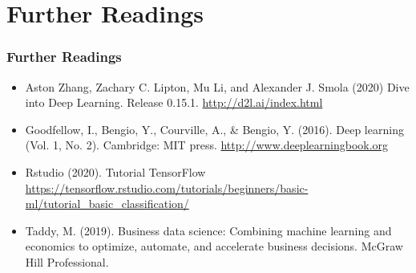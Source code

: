 \documentclass[
  shownotes,
  xcolor={svgnames},
  hyperref={colorlinks,citecolor=DarkBlue,linkcolor=DarkRed,urlcolor=DarkBlue}
  , aspectratio=169]{beamer}
\begin{document}
\section{Further Readings}
\begin{frame}
\frametitle{Further Readings}

\begin{itemize}
\footnotesize

  
  \item Aston Zhang, Zachary C. Lipton, Mu Li, and Alexander J. Smola (2020) Dive into Deep Learning. Release 0.15.1. \url{http://d2l.ai/index.html}
  \medskip
  \item Goodfellow, I., Bengio, Y., Courville, A., \& Bengio, Y. (2016). Deep learning (Vol. 1, No. 2). Cambridge: MIT press. \url{http://www.deeplearningbook.org}
  \medskip 

  \item Rstudio (2020). Tutorial TensorFlow \url{https://tensorflow.rstudio.com/tutorials/beginners/basic-ml/tutorial_basic_classification/}
  \medskip
  \item Taddy, M. (2019). Business data science: Combining machine learning and economics to optimize, automate, and accelerate business decisions. McGraw Hill Professional.


  
\end{itemize}

\end{frame}
\end{document}
